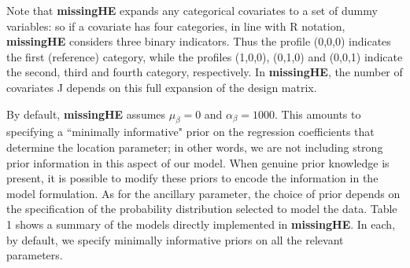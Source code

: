 \documentclass[]{article}
\begin{document}
Note that \textbf{missingHE} expands any categorical covariates to a set
of dummy variables: so if a covariate has four categories, in line with
R notation, \textbf{missingHE} considers three binary indicators. Thus
the profile (0,0,0) indicates the first (reference) category, while the
profiles (1,0,0), (0,1,0) and (0,0,1) indicate the second, third and
fourth category, respectively. In \textbf{missingHE}, the number of
covariates J depends on this full expansion of the design matrix.

By default, \textbf{missingHE} assumes \(\mu_{\beta}=0\) and
\(\alpha_{\beta}=1000\). This amounts to specifying a ``minimally
informative" prior on the regression coefficients that determine the
location parameter; in other words, we are not including strong prior
information in this aspect of our model. When genuine prior knowledge is
present, it is possible to modify these priors to encode the information
in the model formulation. As for the ancillary parameter, the choice of
prior depends on the specification of the probability distribution
selected to model the data. Table 1 shows a summary of the models
directly implemented in \textbf{missingHE}. In each, by default, we
specify minimally informative priors on all the relevant parameters.

\begin{table}[H]
 \centering
 \caption{A list of the distributions supported by \textbf{missingHE} for the effect $(e_{i})$ and cost $(c_{i})$ variables in the MoA with the default weakly informative prior forms assumed. The names on the right-hand side of the table represent the character names in \textbf{missingHE} notation to indicate the corresponding distribution.}
  \end{table}\label{T1}
\end{document}
